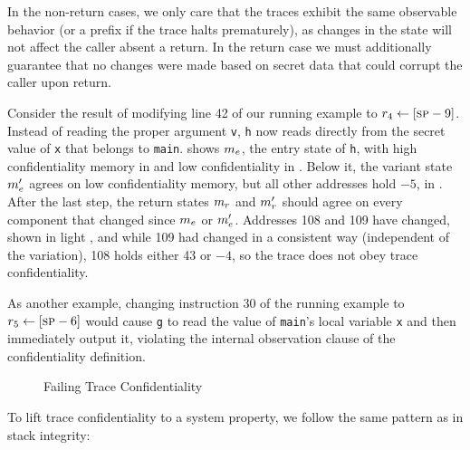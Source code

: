 \documentclass[acmsmall,review,anonymous]{acmart}\settopmatter{printfolios=true,printccs=false,printacmref=false}
\begin{document}
{In the non-return cases, we only care that the traces exhibit the same
observable behavior (or a prefix if the trace halts prematurely), as changes
in the state will not affect the caller absent a return.  In the return case
we must additionally guarantee that no changes were made based on secret data
that could corrupt the caller upon return.

Consider the result of modifying line 42 of our running example to $r_4 \leftarrow [\textsc{sp} - 9]$.
Instead of reading the proper argument {\tt v}, {\tt h} now reads directly from the
secret value of {\tt x} that belongs to {\tt main}. 
shows \(m_e\), the entry state of {\tt h}, with high confidentiality memory
in {\high} and low confidentiality in {\low}. Below it, the variant state
\(m_e'\) agrees on low confidentiality memory, but all other addresses
hold $-5$, in {\varied}.  After the last step, the return states \(m_r\) and
\(m_r'\) should agree on every component that changed since \(m_e\) or
\(m_e'\). Addresses 108 and 109 have changed, shown in light {\low}, and while 109
had changed in a consistent way (independent of the variation), 108 holds either 43 or $-4$, so the trace does not obey trace confidentiality.

As another example, changing instruction 30 of the running example to
$r_5 \leftarrow [\textsc{sp} - 6]$ would cause {\tt g} to read the value of
{\tt main}'s local variable {\tt x} and then immediately output it,
violating the internal observation clause of the confidentiality
definition.

\begin{figure}
  \confidentialityendexample
  \caption{Failing Trace Confidentiality}
  \label{fig:confex}
\end{figure}

To lift trace confidentiality to a system property, we follow the same
pattern as in stack integrity:

}
\end{document}
